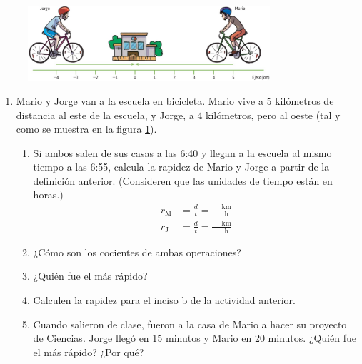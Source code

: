 \documentclass[11pt]{book}
\begin{document}
\begin{figure}[H]
    \centering
    \includegraphics[width=0.8\textwidth]{mario_jorge.jpg}
    \label{fig:mario_jorge}
\end{figure}
\begin{enumerate}

    \item Mario y Jorge van a la escuela en bicicleta. Mario vive a 5 kilómetros de distancia al este
          de la escuela, y Jorge, a 4 kilómetros, pero al oeste (tal y como se muestra en la
          figura \ref{fig:mario_jorge}).
          \begin{enumerate}
              \item Si ambos salen de sus casas a las 6:40
                    y llegan a la escuela al mismo tiempo a las 6:55, calcula la rapidez de
                    Mario y Jorge a partir de la definición anterior.
                    (Consideren que las unidades de tiempo están en horas.)
                    \begin{align*}
                        r_{\text{M}} & =\frac{d}{t}=\frac{\quad \text{ km}}{\quad \text{ h}} \\
                        r_{\text{J}} & =\frac{d}{t}=\frac{\quad \text{ km}}{\quad \text{ h}}
                    \end{align*}

              \item ¿Cómo son los cocientes de ambas operaciones?
              \item ¿Quién fue el más rápido?
              \item Calculen la rapidez para el inciso b de la actividad anterior.
              \item Cuando salieron de clase, fueron a la casa de Mario a hacer su proyecto
                    de Ciencias. Jorge llegó en 15 minutos y Mario en 20 minutos.
                    ¿Quién fue el más rápido? ¿Por qué?
          \end{enumerate}


\end{enumerate}
\end{document}
